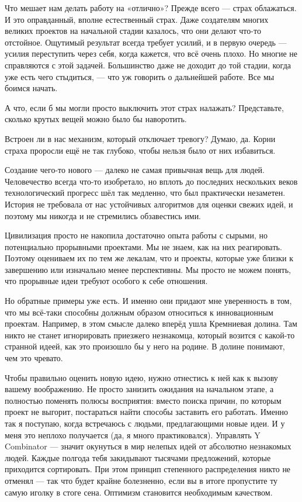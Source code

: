 \documentclass[ebook,12pt,oneside,openany]{memoir}
\begin{document}
\maketitle

Что мешает нам делать работу на «отлично»? Прежде всего — страх
облажаться. И это оправданный, вполне естественный страх. Даже
создателям многих великих проектов на начальной стадии казалось, что
они делают что-то отстойное. Ощутимый результат всегда требует усилий,
и в первую очередь — усилия переступить через себя, когда кажется, что
всё очень плохо. Но многие не справляются с этой задачей. Большинство
даже не доходит до той стадии, когда уже есть чего стыдиться, — что уж
говорить о дальнейшей работе. Все мы боимся начать.

А что, если б мы могли просто выключить этот страх налажать?
Представьте, сколько крутых вещей можно было бы наворотить.

Встроен ли в нас механизм, который отключает тревогу? Думаю, да. Корни
страха проросли ещё не так глубоко, чтобы нельзя было от них
избавиться.

Создание чего-то нового — далеко не самая привычная вещь для людей.
Человечество всегда что-то изобретало, но вплоть до последних
нескольких веков технологический прогресс шёл так медленно, что был
практически незаметен. История не требовала от нас устойчивых
алгоритмов для оценки свежих идей, и поэтому мы никогда и не
стремились обзавестись ими.

Цивилизация просто не накопила достаточно опыта работы с сырыми, но
потенциально прорывными проектами. Мы не знаем, как на них
реагировать. Поэтому оцениваем их по тем же лекалам, что и проекты,
которые уже близки к завершению или изначально менее перспективны. Мы
просто не можем понять, что прорывные идеи требуют особого к себе
отношения.

Но обратные примеры уже есть. И именно они придают мне уверенность в
том, что мы всё-таки способны должным образом относиться к
инновационным проектам. Например, в этом смысле далеко вперёд ушла
Кремниевая долина. Там никто не станет игнорировать приезжего
незнакомца, который возится с какой-то странной идеей, как это
произошло бы у него на родине. В долине понимают, чем это чревато.

Чтобы правильно оценить новую идею, нужно отнестись к ней как к вызову
вашему воображению. Не просто занизить ожидания на начальном этапе, а
полностью поменять полюсы восприятия: вместо поиска причин, по которым
проект не выгорит, постараться найти способы заставить его работать.
Именно так я поступаю, когда встречаюсь с людьми, предлагающими новые
идеи. И у меня это неплохо получается (да, я много практиковался).
Управлять Y Combinator — значит окунуться в мир нелепых идей от
абсолютно незнакомых людей. Каждые полгода тебя закидывают тысячами
предложений, которые приходится сортировать. При этом принцип
степенного распределения никто не отменял — так что будет крайне
болезненно, если вы в итоге пропустите ту самую иголку в стоге сена.
Оптимизм становится необходимым качеством.
\end{document}
